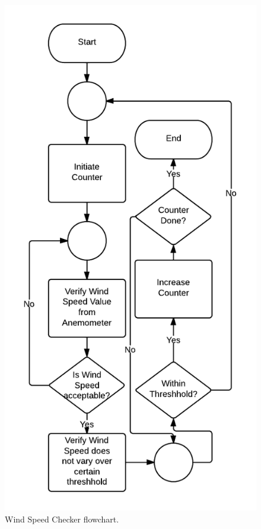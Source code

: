 	\begin{figure}[H]
		\centering
			\includegraphics[scale=0.5]{img/flowchart2}
		\caption{Wind Speed Checker flowchart.}
	\end{figure}
	
